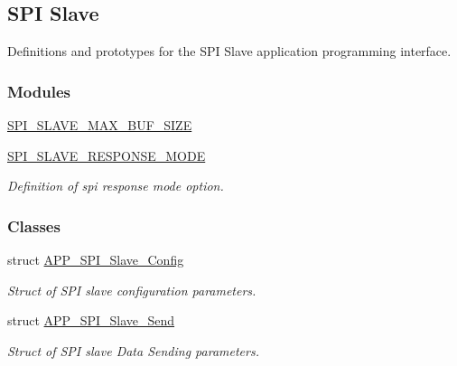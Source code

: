 \hypertarget{group___s_p_i___s_l_a_v_e}{}\subsection{S\+PI Slave}
\label{group___s_p_i___s_l_a_v_e}


Definitions and prototypes for the S\+PI Slave application programming interface.  


\subsubsection*{Modules}
\begin{DoxyCompactItemize}
\item 
\hyperlink{group___s_p_i___s_l_a_v_e___m_a_x___b_u_f___s_i_z_e}{S\+P\+I\+\_\+\+S\+L\+A\+V\+E\+\_\+\+M\+A\+X\+\_\+\+B\+U\+F\+\_\+\+S\+I\+ZE}
\item 
\hyperlink{group___s_p_i___s_l_a_v_e___r_e_s_p_o_n_s_e___m_o_d_e}{S\+P\+I\+\_\+\+S\+L\+A\+V\+E\+\_\+\+R\+E\+S\+P\+O\+N\+S\+E\+\_\+\+M\+O\+DE}
\begin{DoxyCompactList}\small\item\em Definition of spi response mode option. \end{DoxyCompactList}\end{DoxyCompactItemize}
\subsubsection*{Classes}
\begin{DoxyCompactItemize}
\item 
struct \hyperlink{struct_a_p_p___s_p_i___slave___config}{A\+P\+P\+\_\+\+S\+P\+I\+\_\+\+Slave\+\_\+\+Config}
\begin{DoxyCompactList}\small\item\em Struct of S\+PI slave configuration parameters. \end{DoxyCompactList}\item 
struct \hyperlink{struct_a_p_p___s_p_i___slave___send}{A\+P\+P\+\_\+\+S\+P\+I\+\_\+\+Slave\+\_\+\+Send}
\begin{DoxyCompactList}\small\item\em Struct of S\+PI slave Data Sending parameters. \end{DoxyCompactList}\end{DoxyCompactItemize}
